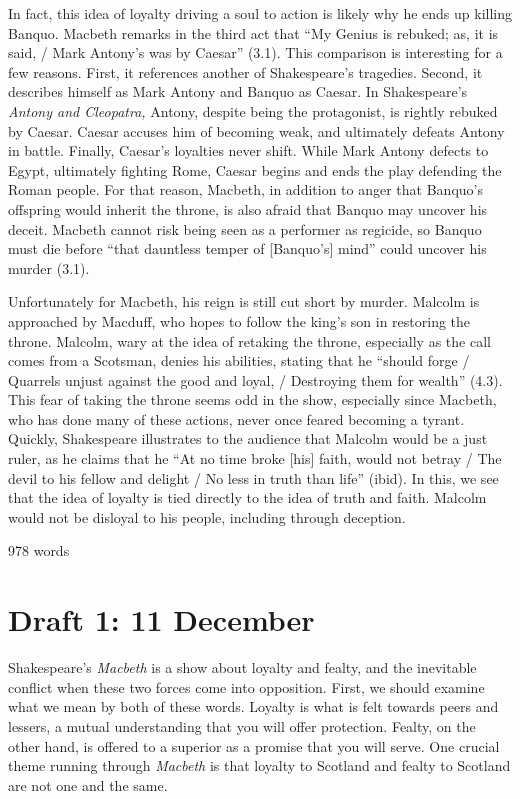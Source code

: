 \documentclass[12pt]{article}[titlepage]
\newcommand{\say}[1]{``#1''}
\newcommand{\1}{\={a}}
\newcommand{\2}{\={e}}
\newcommand{\3}{\={\i}}
\newcommand{\4}{\=o}
\newcommand{\5}{\=u}
\newcommand{\6}{\={A}}
\renewcommand{\,}{\textsuperscript{,}}
\begin{document}
In fact, this idea of loyalty driving a soul to action is likely why he ends up killing Banquo.
Macbeth remarks in the third act that \say{My Genius is rebuked; as, it is said, / Mark Antony's was by Caesar} (3.1).
This comparison is interesting for a few reasons.
First, it references another of Shakespeare's tragedies.
Second, it describes himself as Mark Antony and Banquo as Caesar.
In Shakespeare's \textit{Antony and Cleopatra,} Antony, despite being the protagonist, is rightly rebuked by Caesar.
Caesar accuses him of becoming weak, and ultimately defeats Antony in battle.
Finally, Caesar's loyalties never shift.
While Mark Antony defects to Egypt, ultimately fighting Rome, Caesar begins and ends the play defending the Roman people.
For that reason, Macbeth, in addition to anger that Banquo's offspring would inherit the throne, is also afraid that Banquo may uncover his deceit.
Macbeth cannot risk being seen as a performer as regicide, so Banquo must die before \say{that dauntless temper of [Banquo's] mind} could uncover his murder (3.1).

Unfortunately for Macbeth, his reign is still cut short by murder.
Malcolm is approached by Macduff, who hopes to follow the king's son in restoring the throne.
Malcolm, wary at the idea of retaking the throne, especially as the call comes from a Scotsman, denies his abilities, stating that he \say{should forge / Quarrels unjust against the good and loyal, / Destroying them for wealth} (4.3).
This fear of taking the throne seems odd in the show, especially since Macbeth, who has done many of these actions, never once feared becoming a tyrant.
Quickly, Shakespeare illustrates to the audience that Malcolm would be a just ruler, as he claims that he \say{At no time broke [his] faith, would not betray / The devil to his fellow and delight / No less in truth than life} (ibid).
In this, we see that the idea of loyalty is tied directly to the idea of truth and faith.
Malcolm would not be disloyal to his people, including through deception.

978 words
\section{Draft 1: 11 December}
Shakespeare's \textit{Macbeth} is a show about loyalty and fealty, and the inevitable conflict when these two forces come into opposition.
First, we should examine what we mean by both of these words.
Loyalty is what is felt towards peers and lessers, a mutual understanding that you will offer protection.
Fealty, on the other hand, is offered to a superior as a promise that you will serve.
One crucial theme running through \textit{Macbeth} is that loyalty to Scotland and fealty to Scotland are not one and the same.
\end{document}
